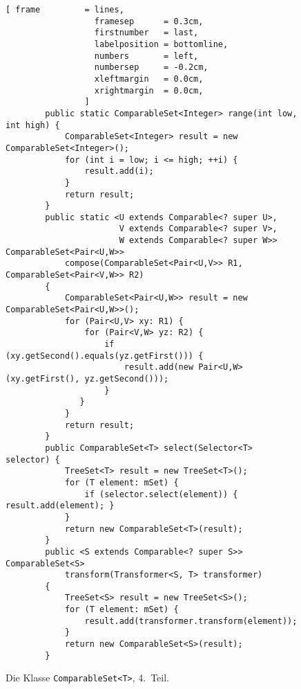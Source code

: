 \begin{figure}[!h]
\centering
\begin{Verbatim}[ frame         = lines, 
                  framesep      = 0.3cm, 
                  firstnumber   = last,
                  labelposition = bottomline,
                  numbers       = left,
                  numbersep     = -0.2cm,
                  xleftmargin   = 0.0cm,
                  xrightmargin  = 0.0cm,
                ]
        public static ComparableSet<Integer> range(int low, int high) {
            ComparableSet<Integer> result = new ComparableSet<Integer>();
            for (int i = low; i <= high; ++i) {
                result.add(i);
            }
            return result;
        }   
        public static <U extends Comparable<? super U>, 
                       V extends Comparable<? super V>, 
                       W extends Comparable<? super W>> ComparableSet<Pair<U,W>> 
            compose(ComparableSet<Pair<U,V>> R1, ComparableSet<Pair<V,W>> R2) 
        {
            ComparableSet<Pair<U,W>> result = new ComparableSet<Pair<U,W>>();
            for (Pair<U,V> xy: R1) {
                for (Pair<V,W> yz: R2) {
                    if (xy.getSecond().equals(yz.getFirst())) {
                        result.add(new Pair<U,W>(xy.getFirst(), yz.getSecond()));
                    }
               }
            }    
            return result;
        }
        public ComparableSet<T> select(Selector<T> selector) {
            TreeSet<T> result = new TreeSet<T>();
            for (T element: mSet) {
                if (selector.select(element)) { result.add(element); }
            }
            return new ComparableSet<T>(result);
        }
        public <S extends Comparable<? super S>> ComparableSet<S> 
            transform(Transformer<S, T> transformer) 
        {
            TreeSet<S> result = new TreeSet<S>();
            for (T element: mSet) {
                result.add(transformer.transform(element));
            }
            return new ComparableSet<S>(result);
        }
    \end{Verbatim}
\vspace*{-0.3cm}
\caption{Die Klasse \texttt{ComparableSet<T>}, 4.~Teil.}
\label{fig:ComparableSet-4}
\end{figure}

